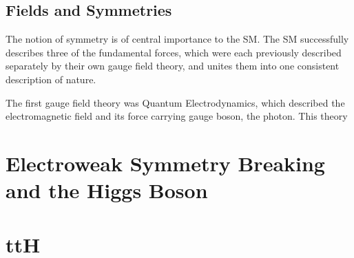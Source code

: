\subsection{Fields and Symmetries}
The notion of symmetry is of central importance to the SM. The SM successfully describes three of the fundamental forces, which were each previously described separately by their own gauge field theory, and unites them into one consistent description
of nature. 

The first gauge field theory was Quantum Electrodynamics, which described the electromagnetic field and its force carrying gauge boson, the photon. This theory 

\section{Electroweak Symmetry Breaking and the Higgs Boson}


\section{ttH}


%
% 
% 
